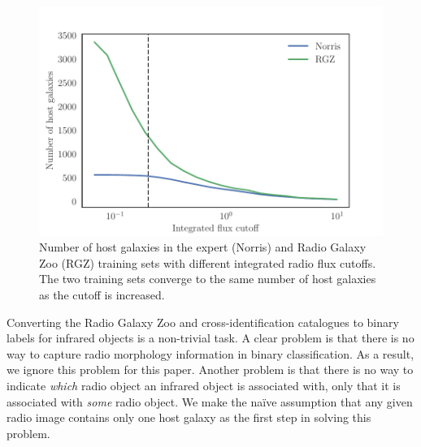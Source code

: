 \documentclass[fleqn,usenatbib,usedcolumn]{mnras}
\begin{document}
    \begin{figure}
      \centering
      \includegraphics[width=\columnwidth]{images/host_galaxies_flux_cutoff.pdf}
      \caption{Number of host galaxies in the expert (Norris) and Radio Galaxy
        Zoo (RGZ) training sets with different integrated radio flux cutoffs.
        The two training sets converge to the same number of host galaxies as
        the cutoff is increased.}
      \label{fig:distribution-cutoffs}
    \end{figure}
    
    Converting the Radio Galaxy Zoo and \citet{norris06} cross-identification
    catalogues to binary labels for infrared objects is a non-trivial task. A
    clear problem is that there is no way to capture radio morphology
    information in binary classification. As a result, we ignore this problem
    for this paper. Another problem is that there is no way to indicate
    \emph{which} radio object an infrared object is associated with, only that
    it is associated with \emph{some} radio object. We make the na\"ive
    assumption that any given radio image contains only one host galaxy as the
    first step in solving this problem.
\end{document}
